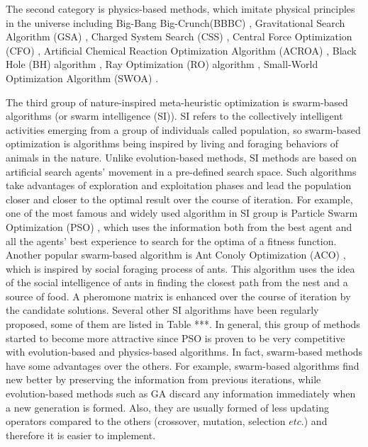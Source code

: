 \documentclass[a4paper,13pt,2p]{report}
\begin{document}
	The second category is physics-based methods, which imitate physical principles in the universe including Big-Bang Big-Crunch(BBBC) \cite{erol2006new}, Gravitational Search Algorithm (GSA) \cite{rashedi2009gsa}, Charged System Search (CSS) \cite{kaveh2010novel}, Central Force Optimization (CFO) \cite{formato2007central}, Artificial Chemical Reaction Optimization Algorithm (ACROA) \cite{alatas2011acroa}, Black Hole (BH) algorithm \cite{hatamlou2013black}, Ray Optimization (RO) algorithm \cite{kaveh2012new}, Small-World Optimization Algorithm
(SWOA)  \cite{du2006small}.

	The third group of nature-inspired meta-heuristic optimization is swarm-based algorithms (or swarm intelligence (SI)). SI refers to the collectively intelligent activities emerging from a group of individuals called population, so swarm-based optimization is algorithms being inspired by living and foraging behaviors of animals in the nature. Unlike evolution-based methods, SI methods are based on artificial search agents' movement in a pre-defined search space. Such algorithms take advantages of exploration and exploitation phases and lead the population closer and closer to the optimal result over the course of iteration. For example, one of the most famous and widely used algorithm in SI group is Particle Swarm Optimization (PSO) \cite{eberhart1995particle}, which uses the information both from the best agent and all the agents' best experience to search for the optima of a fitness function. Another popular swarm-based algorithm is Ant Conoly Optimization (ACO) \cite{dorigo1999ant}, which is inspired by social foraging process of ants. This algorithm uses the idea of the social intelligence of ants in finding the closest path from the nest and a source of food. A pheromone matrix is
enhanced over the course of iteration by the candidate solutions.  Several other SI algorithms have been regularly proposed, some of them are listed in Table ***. In general, this group of methods started to become more attractive since PSO is proven to be very competitive with evolution-based and physics-based algorithms. In fact, swarm-based methods have some advantages over the others. For example, swarm-based algorithms find new better by preserving the information from previous iterations, while evolution-based methods such as GA discard any information immediately when a new generation is formed. Also, they are usually formed of less updating operators compared to the others (crossover, mutation, selection $etc.$) and therefore it is easier to implement.
\end{document}
